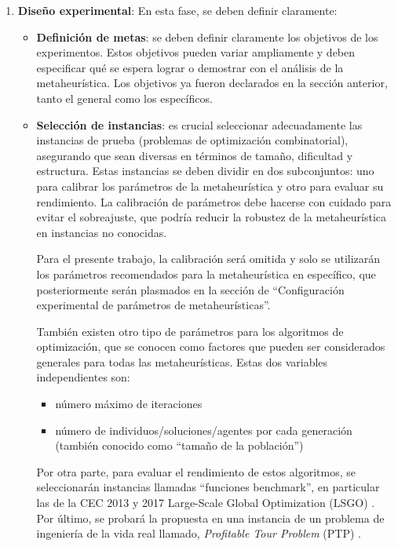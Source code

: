 \begin{enumerate}
    \item \textbf{Diseño experimental}: En esta fase, se deben definir claramente:
    \begin{itemize}
        \item \textbf{Definición de metas}: se deben definir claramente los objetivos de los experimentos. Estos objetivos pueden variar ampliamente y deben especificar qué se espera lograr o demostrar con el análisis de la metaheurística. Los objetivos ya fueron declarados en la sección anterior, tanto el general como los específicos.

        \item \textbf{Selección de instancias}: es crucial seleccionar adecuadamente las instancias de prueba (problemas de optimización combinatorial), asegurando que sean diversas en términos de tamaño, dificultad y estructura. Estas instancias se deben dividir en dos subconjuntos: uno para calibrar los parámetros de la metaheurística y otro para evaluar su rendimiento. La calibración de parámetros debe hacerse con cuidado para evitar el sobreajuste, que podría reducir la robustez de la metaheurística en instancias no conocidas.

        Para el presente trabajo, la calibración será omitida y solo se utilizarán los parámetros recomendados para la metaheurística en específico, que posteriormente serán plasmados en la sección de ``Configuración experimental de parámetros de metaheurísticas''.

        También existen otro tipo de parámetros para los algoritmos de optimización, que se conocen como factores que pueden ser considerados generales para todas las metaheurísticas. Estas dos variables independientes son:
        \begin{itemize}
            \item número máximo de iteraciones
            \item número de individuos/soluciones/agentes por cada generación (también conocido como ``tamaño de la población'')
        \end{itemize}

        Por otra parte, para evaluar el rendimiento de estos algoritmos, se seleccionarán instancias llamadas ``funciones benchmark'', en particular las de la CEC 2013 y 2017 Large-Scale Global Optimization (LSGO) \cite{li2013benchmark, wu2017problem}. Por último, se probará la propuesta en una instancia de un problema de ingeniería de la vida real llamado, \textit{Profitable Tour Problem} (PTP) \cite{Vansteenwegen2019}.


\end{itemize}
\end{enumerate}
